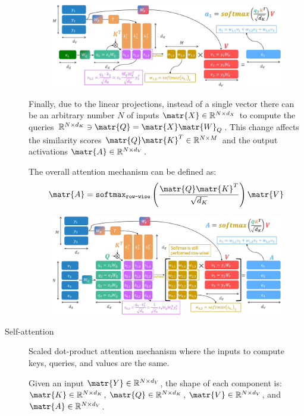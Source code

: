 \begin{description}
        \begin{figure}[H]
            \centering
            \includegraphics[width=0.8\linewidth]{./img/_scaled_dot_attention.jpg}
        \end{figure}

        Finally, due to the linear projections, instead of a single vector there can be an arbitrary number $N$ of inputs $\matr{X} \in \mathbb{R}^{N \times d_X}$ to compute the queries $\mathbb{R}^{N \times d_K} \ni \matr{Q} = \matr{X} \matr{W}_Q$. This change affects the similarity scores $\matr{Q}\matr{K}^T \in \mathbb{R}^{N \times M}$ and the output activations $\matr{A} \in \mathbb{R}^{N \times d_V}$. 

        The overall attention mechanism can be defined as:
        \[ \matr{A} = \texttt{softmax}_\texttt{row-wise}\left( \frac{\matr{Q}\matr{K}^T}{\sqrt{d_K}} \right) \matr{V} \]

        \begin{figure}[H]
            \centering
            \includegraphics[width=0.8\linewidth]{./img/_scaled_dot_attention_multi_q.jpg}
        \end{figure}

    \item[Self-attention] 
        Scaled dot-product attention mechanism where the inputs to compute keys, queries, and values are the same.

        Given an input $\matr{Y} \in \mathbb{R}^{N \times d_Y}$, the shape of each component is: $\matr{K} \in \mathbb{R}^{N \times d_K}$, $\matr{Q} \in \mathbb{R}^{N \times d_K}$, $\matr{V} \in \mathbb{R}^{N \times d_V}$, and $\matr{A} \in \mathbb{R}^{N \times d_V}$.


\end{description}
